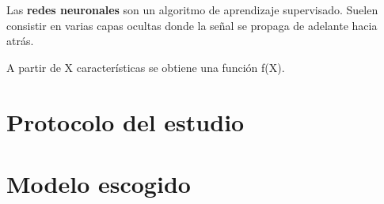 	Las \textbf{redes neuronales} son un algoritmo de aprendizaje supervisado. Suelen consistir en varias capas ocultas donde la señal se propaga de adelante hacia atrás.
	
	A partir de X características se obtiene una función f(X).
	
\section{Protocolo del estudio}
\label{makereference3.4}

\section{Modelo escogido}
\label{makereference3.5}
